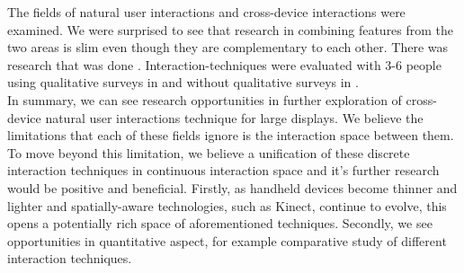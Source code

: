 The fields of natural user interactions and cross-device interactions were examined. 
We were surprised to see that research in combining features from the two areas is slim even though they are complementary to each other. 
There was research that was done \cite{Scharf:2013,Seifert:2012,Valkanova:2014,Vogel:2005} . 
Interaction-techniques were evaluated with 3-6 people using qualitative surveys in \cite{Seifert:2012,Valkanova:2014,Vogel:2005} and without qualitative surveys in \cite{Schmidt:2012}.\\

In summary, we can see research opportunities in further exploration of cross-device natural user interactions technique for large displays. We believe the limitations that each of these fields ignore is the interaction space between them. To move beyond this limitation, we believe a unification of these discrete interaction techniques in continuous interaction space and it's further research would be positive and beneficial.
Firstly, as handheld devices become thinner and lighter and spatially-aware technologies, such as Kinect, continue to evolve, this opens a potentially rich space of aforementioned techniques. 
Secondly, we see opportunities in quantitative aspect, for example comparative study of different interaction techniques. 
